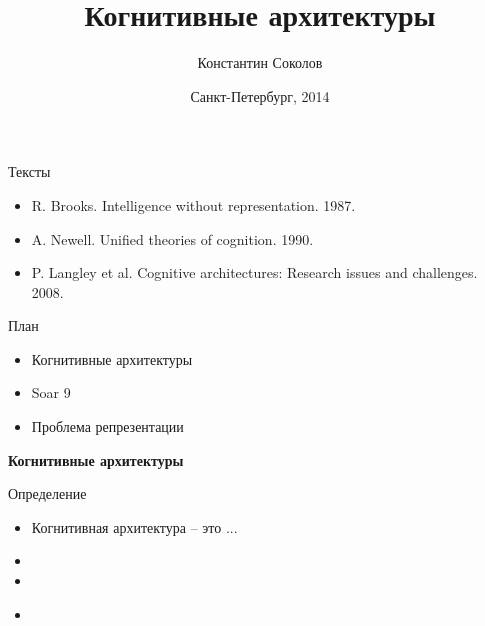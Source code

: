 \documentclass{beamer}
\begin{document}
\title{\Large{Когнитивные архитектуры}}
\author{Константин Соколов}
\date{Санкт-Петербург, 2014} 
\begin{frame}
    \thispagestyle{empty}
    \titlepage
\end{frame}

\begin{frame}{Тексты}
\setcounter{framenumber}{1}
\begin{itemize}
	\item R. Brooks. Intelligence without representation. 1987.
    \medskip
    \item A. Newell. Unified theories of cognition. 1990.
    \medskip
    \item P. Langley et al. Cognitive architectures: Research issues and challenges. 2008.
\end{itemize}
\end{frame}

\begin{frame}{План}
    \begin{itemize}
        \item Когнитивные архитектуры
        \medskip
        \item Soar 9
        \medskip
        \item Проблема репрезентации
        \medskip
    \end{itemize}
\end{frame}


%
%

\begin{frame}{}
\begin{center}
	\textbf{Когнитивные архитектуры}
\end{center}
\end{frame}

\begin{frame}{Определение}
\begin{itemize}
	\item Когнитивная архитектура -- это ...
	\medskip
	\item 
	\medskip
	\item  
\end{itemize}
\end{frame}

\begin{frame}{}
\begin{itemize}
	\item 
	\medskip
\end{itemize}
\end{frame}
\end{document}
